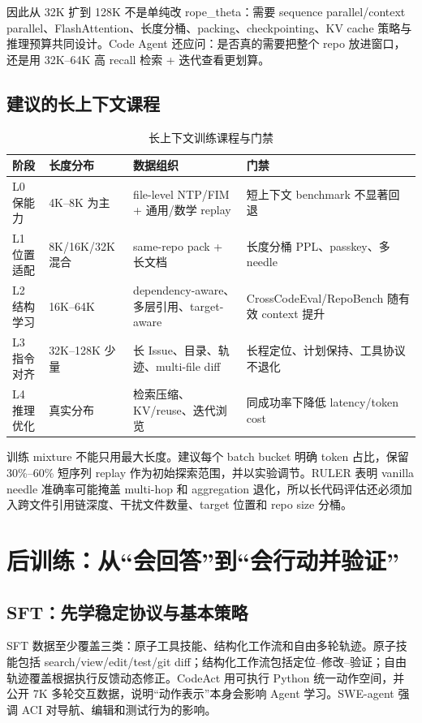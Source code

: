 \documentclass[10pt,a4paper,UTF8,fontset=none]{ctexart}
\newcommand{\ident}[1]{{\rmfamily #1}}
\begin{document}
因此从 32K 扩到 128K 不是单纯改 \ident{rope\_theta}：需要 sequence parallel/context parallel、FlashAttention、长度分桶、packing、checkpointing、KV cache 策略与推理预算共同设计。Code Agent 还应问：是否真的需要把整个 repo 放进窗口，还是用 32K--64K 高 recall 检索 + 迭代查看更划算。

\subsection{建议的长上下文课程}

\begin{table}[htbp]
\centering
\caption{长上下文训练课程与门禁}
\label{tab:long-curriculum}
\small
\begin{tabularx}{\textwidth}{p{2.2cm}p{2.5cm}YY}
\toprule
阶段 & 长度分布 & 数据组织 & 门禁 \\
\midrule
L0 保能力 & 4K--8K 为主 & file-level NTP/FIM + 通用/数学 replay & 短上下文 benchmark 不显著回退 \\
L1 位置适配 & 8K/16K/32K 混合 & same-repo pack + 长文档 & 长度分桶 PPL、passkey、多 needle \\
L2 结构学习 & 16K--64K & dependency-aware、多层引用、target-aware & CrossCodeEval/RepoBench 随有效 context 提升 \\
L3 指令对齐 & 32K--128K 少量 & 长 Issue、目录、轨迹、multi-file diff & 长程定位、计划保持、工具协议不退化 \\
L4 推理优化 & 真实分布 & 检索压缩、KV/reuse、迭代浏览 & 同成功率下降低 latency/token cost \\
\bottomrule
\end{tabularx}
\end{table}

训练 mixture 不能只用最大长度。建议每个 batch bucket 明确 token 占比，保留 30\%--60\% 短序列 replay 作为初始探索范围，并以实验调节。RULER 表明 vanilla needle 准确率可能掩盖 multi-hop 和 aggregation 退化\cite{hsieh2024ruler}，所以长代码评估还必须加入跨文件引用链深度、干扰文件数量、target 位置和 repo size 分桶。

\section{后训练：从“会回答”到“会行动并验证”}

\subsection{SFT：先学稳定协议与基本策略}

SFT 数据至少覆盖三类：原子工具技能、结构化工作流和自由多轮轨迹。原子技能包括 search/view/edit/test/git diff；结构化工作流包括定位--修改--验证；自由轨迹覆盖根据执行反馈动态修正。CodeAct 用可执行 Python 统一动作空间，并公开 7K 多轮交互数据，说明“动作表示”本身会影响 Agent 学习\cite{wang2024codeact}。SWE-agent 强调 ACI 对导航、编辑和测试行为的影响\cite{yang2024sweagent}。
\end{document}

